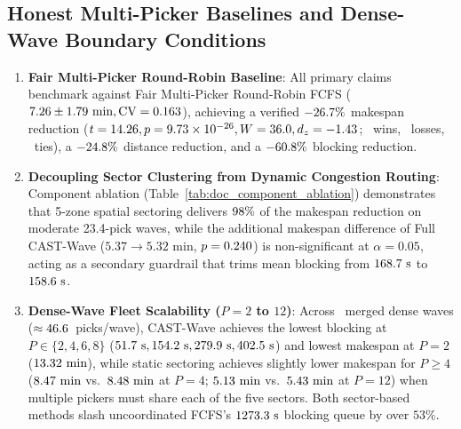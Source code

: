 \documentclass[11pt,a4paper]{article}
\begin{document}
\subsection{Honest Multi-Picker Baselines and Dense-Wave Boundary Conditions}
\begin{enumerate}[leftmargin=*]
    \item \textbf{Fair Multi-Picker Round-Robin Baseline}: All primary claims benchmark against Fair Multi-Picker Round-Robin FCFS ($7.26 \pm 1.79\text{ min}, \text{CV} = 0.163$), achieving a verified $-26.7\%$ makespan reduction ($t = 14.26, p = 9.73 \times 10^{-26}, W = 36.0, d_z = -1.43$; \WinsVsSShape~wins, \LossesVsSShape~losses, \TiesVsSShape~ties), a $-24.8\%$ distance reduction, and a $-60.8\%$ blocking reduction.
    \item \textbf{Decoupling Sector Clustering from Dynamic Congestion Routing}: Component ablation (Table~\ref{tab:doc_component_ablation}) demonstrates that 5-zone spatial sectoring delivers $98\%$ of the makespan reduction on moderate 23.4-pick waves, while the additional makespan difference of Full CAST-Wave ($5.37 \to 5.32\text{ min}$, $p = 0.240$) is non-significant at $\alpha = 0.05$, acting as a secondary guardrail that trims mean blocking from $168.7\text{ s}$ to $158.6\text{ s}$.
    \item \textbf{Dense-Wave Fleet Scalability ($P = 2$ to $12$)}: Across \DenseWavesCount~merged dense waves ($\approx 46.6$~picks/wave), CAST-Wave achieves the lowest blocking at $P \in \{2, 4, 6, 8\}$ ($51.7\text{ s}, 154.2\text{ s}, 279.9\text{ s}, 402.5\text{ s}$) and lowest makespan at $P = 2$ ($13.32\text{ min}$), while static sectoring achieves slightly lower makespan for $P \ge 4$ ($8.47\text{ min}$ vs.\ $8.48\text{ min}$ at $P=4$; $5.13\text{ min}$ vs.\ $5.43\text{ min}$ at $P=12$) when multiple pickers must share each of the five sectors. Both sector-based methods slash uncoordinated FCFS's $1273.3\text{ s}$ blocking queue by over $53\%$.
\end{enumerate}

\end{document}
